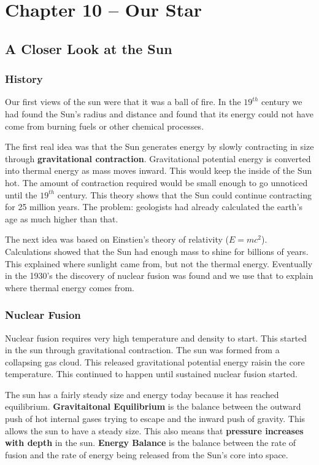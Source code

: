 \section{Chapter 10 -- Our Star}
\subsection{A Closer Look at the Sun}
\subsubsection{History}
Our first views of the sun were that it was a ball of fire. In the $19^{th}$ century we had found the Sun's radius and distance and found that its energy could not have come from burning fuels or other chemical processes.

The first real idea was that the Sun generates energy by slowly contracting in size through \textbf{gravitational contraction}. Gravitational potential energy is converted into thermal energy as mass moves inward. This would keep the inside of the Sun hot. The amount of contraction required would be small enough to go unnoticed until the $19^{th}$ century. This theory shows that the Sun could continue contracting for 25 million years. The problem: geologists had already calculated the earth's age as much higher than that.

The next idea was based on Einstien's theory of relativity ($E=mc^2$). Calculations showed that the Sun had enough mass to shine for billions of years. This explained where sunlight came from, but not the thermal energy. Eventually in the  1930's the discovery of nuclear fusion was found and we use that to explain where thermal energy comes from.

\subsubsection{Nuclear Fusion}
Nuclear fusion requires very high temperature and density to start. This started in the sun through gravitational contraction. The sun was formed from a collapsing gas cloud. This released gravitational potential energy raisin the core temperature. This continued to happen until sustained nuclear fusion started.

The sun has a fairly steady size and energy today because it has reached equilibrium. \textbf{Gravitaitonal Equilibrium} is the balance between the outward push of hot internal gases trying to escape and the inward push of gravity. This allows the sun to have a steady size. This also means that \textbf{pressure increases with depth} in the sun. \textbf{Energy Balance} is the balance between the rate of fusion and the rate of energy being released from the Sun's core into space.

